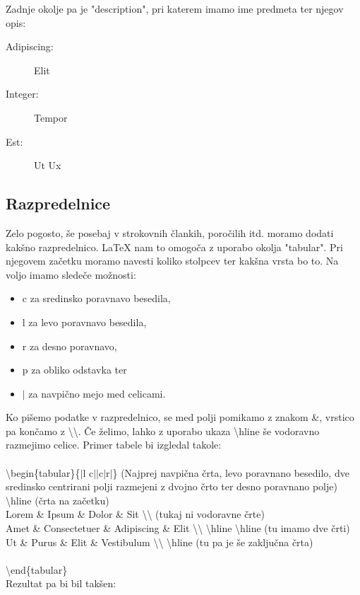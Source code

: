 \documentclass[a4paper]{book}
\newcommand\tbs{\textbackslash{}}
\begin{document}
Zadnje okolje pa je "description", pri katerem imamo ime predmeta ter njegov opis:
\begin{description}
\item[Adipiscing:] Elit
\item[Integer:] Tempor
\item[Est:] Ut Ux
\end{description}

\subsection{Razpredelnice}

Zelo pogosto, še posebaj v strokovnih člankih, poročilih itd. moramo dodati kakšno razpredelnico. \LaTeX{} nam to omogoča z uporabo okolja "tabular". 
Pri njegovem začetku moramo navesti koliko stolpcev ter kakšna vrsta bo to. Na voljo imamo sledeče možnosti:
\begin{itemize}
\item c za sredinsko poravnavo besedila,
\item l za levo poravnavo besedila,
\item r za desno poravnavo,
\item p za obliko odstavka ter
\item $|$ za navpično mejo med celicami.
\end{itemize}

Ko pišemo podatke v razpredelnico, se med polji pomikamo z znakom \&{}, vrstico pa končamo z \tbs\tbs. Če želimo, lahko z uporabo ukaza \tbs{}hline še vodoravno razmejimo celice.
Primer tabele bi izgledal takole:\\ \\
\tbs{}begin\{tabular\}\{$|$l c$||$c$|$r$|$\} (Najprej navpična črta, levo poravnano besedilo, dve sredinsko centrirani polji razmejeni z dvojno črto ter desno poravnano polje)\\
\tbs{}hline (črta na začetku)\\
Lorem \& Ipsum \& Dolor \& Sit \tbs{}\tbs{} (tukaj ni vodoravne črte)\\
Amet \& Consectetuer \& Adipiscing \& Elit \tbs{}\tbs{} \tbs{}hline \tbs{}hline (tu imamo dve črti)\\
Ut \& Purus \& Elit \& Vestibulum \tbs{}\tbs{} \tbs{}hline (tu pa je še zaključna črta)\\\\
\tbs{}end\{tabular\}\\


Rezultat pa bi bil takšen:\\
\end{document}
